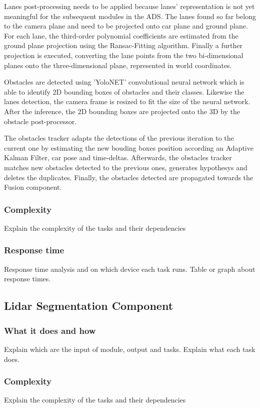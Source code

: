 \documentclass[conference]{IEEEtran}
\begin{document}
Lanes post-processing needs to be applied because lanes' representation is not yet meaningful for the subsequent modules in the ADS.
The lanes found so far belong to the camera plane and need to be projected onto car plane and ground plane.
For each lane, the third-order polynomial coefficients are estimated from the ground plane projection using the Ransac-Fitting algorithm.
Finally a further projection is executed, converting the lane points from the two bi-dimensional planes onto the three-dimensional plane, represented in world coordinates.

Obstacles are detected using 'YoloNET' convolutional neural network which is able to identify 2D bounding boxes of obstacles and their classes.
Likewise the lanes detection, the camera frame is resized to fit the size of the neural network. After the inference, the 2D bounding boxes are projected onto the 3D by the obstacle post-processor.

The obstacles tracker adapts the detections of the previous iteration to the current one by estimating the new bouding boxes position according an Adaptive Kalman Filter, car pose and time-deltas.
Afterwards, the obstacles tracker matches new obstacles detected to the previous ones, generates hypothesys and deletes the duplicates.
Finally, the obstacles detected are propagated towards the Fusion component.

\subsubsection*{Complexity}
Explain the complexity of the tasks and their dependencies
\subsubsection*{Response time}
Response time analysis and on which device each task runs.
Table or graph about response times.

\subsection{Lidar Segmentation Component}

\subsubsection{What it does and how}
Explain which are the input of module, output and tasks.
Explain what each task does.
\subsubsection{Complexity}
Explain the complexity of the tasks and their dependencies
\end{document}
